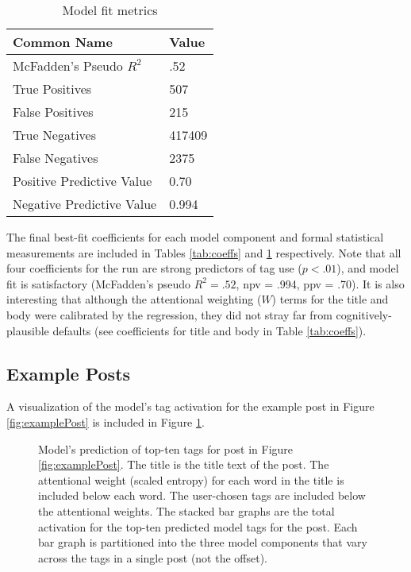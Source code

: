 \documentclass[10pt,letterpaper]{article}
\begin{document}
\renewcommand{\arraystretch}{1}
\renewcommand{\tabcolsep}{3mm}
\begin{table}[!ht]
  \begin{center}
    \caption{Model fit metrics}
    \label{tab:fits}
    \vskip 0.12in
    \begin{tabular}{ll}
      \hline
      Common Name &  Value	\\
      \hline
      McFadden's Pseudo $R_{}^{2}$ &	.52 \\
      True Positives &			507 \\
      False Positives &			215 \\
      True Negatives &			\num{417409} \\
      False Negatives &			\num{2375} \\
      Positive Predictive Value &	0.70 \\
      Negative Predictive Value &	0.994 \\
      \hline
    \end{tabular}
  \end{center}
\end{table}

The final best-fit coefficients for each model component and formal statistical measurements are included in Tables \ref{tab:coeffs} and \ref{tab:fits} respectively.
Note that all four coefficients for the run are strong predictors of tag use ($p<.01$), and model fit is satisfactory (McFadden's pseudo $R_{}^{2}=.52$, npv = .994, ppv = .70).
It is also interesting that although the attentional weighting ($W$) terms for the title and body were calibrated by the regression, they did not stray far from cognitively-plausible defaults
(see coefficients for title and body in Table \ref{tab:coeffs}).

\subsection{Example Posts}

A visualization of the model's tag activation for the example post in Figure \ref{fig:examplePost} is included in Figure \ref{fig:modelPost}.

\begin{figure}[ht]
  \centering
  \caption{
    Model's prediction of top-ten tags for post in Figure \ref{fig:examplePost}.
    The title is the title text of the post.
    The attentional weight (scaled entropy) for each word in the title is included below each word.
    The user-chosen tags are included below the attentional weights.
    The stacked bar graphs are the total activation for the top-ten predicted model tags for the post.
    Each bar graph is partitioned into the three model components that vary across the tags in a single post (not the offset).
}
  \label{fig:modelPost}
\end{figure}
\end{document}
